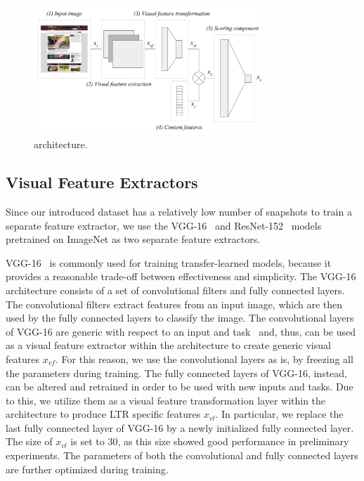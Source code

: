 

\begin{figure}[t]
\includegraphics[width = 3.4in]{images/multimodelarchitecture.pdf}
\caption{\datasetname{} architecture.}
\label{fig:multimodelarchitecture}
\end{figure}

\subsection{Visual Feature Extractors} \label{sec:visualfeatures}
Since our introduced \datasetname{} data\-set has a relatively low number of snapshots to train a separate feature extractor, we use the VGG-16~\cite{simonyan2014very} and ResNet-152~\cite{he2016deep} models pretrained on ImageNet as two separate feature extractors.

VGG-16~\cite{simonyan2014very} is commonly used for training transfer-learned models,
because it provides a reasonable trade-off between effectiveness and simplicity.
The VGG-16 architecture consists of a set of convolutional filters and fully connected layers. 
The convolutional filters extract features from an input image, which are then used by the fully connected layers to classify the image. 
The convolutional layers of VGG-16 are generic with respect to an input and task~\citep{donahue2014decaf}
and, thus, can be used as a visual feature extractor within the \datasetname{} architecture to create generic visual features $x_{vf}$.
For this reason, we use the convolutional layers as is, by freezing all the parameters during training.
The fully connected layers of VGG-16, instead, can be altered and retrained in order to be used with new inputs and tasks.
Due to this, we utilize them as a visual feature transformation layer within the \datasetname{} architecture to produce \ac{LTR} specific features $x_{vl}$.
In particular, we replace the last fully connected layer of VGG-16 by a newly initialized fully connected layer.
The size of $x_{vl}$ is set to $30$, as this size showed good performance in preliminary experiments.
The parameters of both the convolutional and fully connected layers are further optimized during training.


